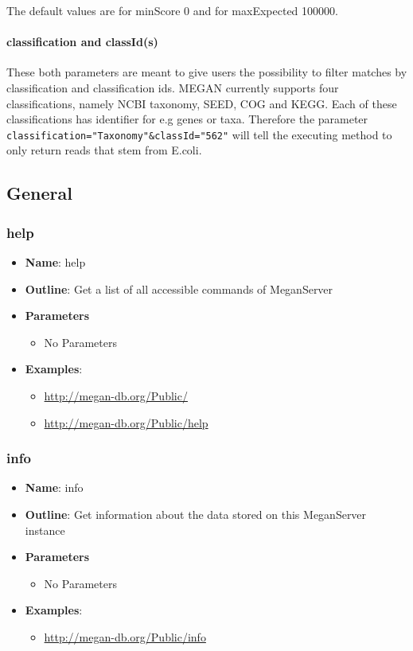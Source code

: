 \documentclass[11pt]{article}
\begin{document}
The default values are for minScore 0 and for maxExpected 100000.


\paragraph{classification and classId(s)}
\label{subsec:class}
These both parameters are meant to give users the possibility to filter matches by classification and classification ids. MEGAN currently supports four classifications, namely NCBI taxonomy, SEED, COG and KEGG. Each of these classifications has identifier for e.g genes or taxa. Therefore the parameter \texttt{classification="Taxonomy"\&classId="562"} will tell the executing method to only return reads that stem from E.coli.



\subsection{General}
\subsubsection{help}

\begin{itemize}
	\item \textbf{Name}: help
	\item \textbf{Outline}: Get a list of all accessible commands of MeganServer
	\item \textbf{Parameters}
		\begin{itemize}
			\item No Parameters
		\end{itemize}
	\item \textbf{Examples}:
		\begin{itemize}
			\item \url{http://megan-db.org/Public/}
			\item \url{http://megan-db.org/Public/help}
		\end{itemize}
\end{itemize}

\subsubsection{info}

\begin{itemize}
	\item \textbf{Name}: info
	\item \textbf{Outline}: Get information about the data stored on this MeganServer instance
	\item \textbf{Parameters}
		\begin{itemize}
			\item No Parameters
		\end{itemize}
	\item \textbf{Examples}:
		\begin{itemize}
			\item \url{http://megan-db.org/Public/info}
		\end{itemize}
\end{itemize}
\end{document}
